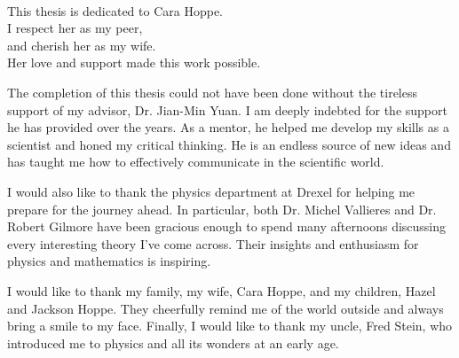 \begin{preamble}

\iffinal{}{\newpage}
\begin{DUTdedications}
%
\vspace*{\fill}
%
\begin{center}
\begin{minipage}{8 cm}
\begin{center}
\hrulefill\\
This thesis is dedicated to Cara Hoppe.\\ 
I respect her as my peer,\\
and cherish her as my wife.\\
Her love and support made this work possible. \\
\hrulefill
\vspace{6em}
\end{center}
\end{minipage}
\end{center} 
%
\vspace*{\fill}
%
\end{DUTdedications} 
\iffinal{}{\newpage}

\begin{acknowledgments}
The completion of this thesis could not have been done without the tireless support of my advisor, Dr. Jian-Min Yuan. I am deeply indebted for the support he has provided over the years. As a mentor, he helped me develop my skills as a scientist and honed my critical thinking. He is an endless source of new ideas and has taught me how to effectively communicate in the scientific world. 

I would also like to thank the physics department at Drexel for helping me prepare for the journey ahead. In particular, both Dr. Michel Vallieres and Dr. Robert Gilmore have been gracious enough to spend many afternoons discussing every interesting theory I've come across. Their insights and enthusiasm for physics and mathematics is inspiring. 

I would like to thank my family, my wife, Cara Hoppe, and my children, Hazel and Jackson Hoppe. They cheerfully remind me of the world outside and always bring a smile to my face. Finally, I would like to thank my uncle, Fred Stein, who introduced me to physics and all its wonders at an early age.
 
  \end{acknowledgments}
  \iffinal{}{\newpage}


\end{preamble}

